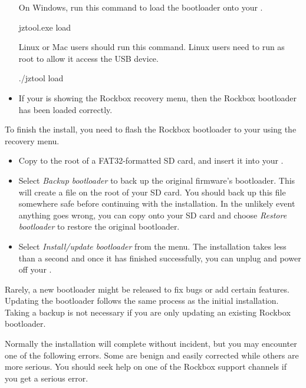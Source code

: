 \begin{itemize}
  On Windows, run this command to load the bootloader onto your \dap{}.
  \begin{code}
    jztool.exe \jztoolsubcommand{} load \bootfilename{}
  \end{code}
  Linux or Mac users should run this command. Linux users need to run
   as root to allow it access the USB device.
  \begin{code}
    ./jztool \jztoolsubcommand{} load \bootfilename{}
  \end{code}
\item If your \dap{} is showing the Rockbox recovery menu, then the Rockbox
  bootloader has been loaded correctly.
\end{itemize}

To finish the install, you need to flash the Rockbox bootloader to your \dap{}
using the recovery menu.

\begin{itemize}
\item Copy \bootfilename{} to the root of a FAT32-formatted SD card, and insert
  it into your \dap{}.
\item Select \emph{Backup bootloader} to back up the original firmware's
  bootloader. This will create a file \bootbackupfilename{} on the root of your
  SD card. You should back up this file somewhere safe before continuing with
  the installation. In the unlikely event anything goes wrong, you can copy
  \bootbackupfilename{} onto your SD card and choose \emph{Restore bootloader}
  to restore the original \playerman{} bootloader.
\item Select \emph{Install/update bootloader} from the menu. The installation
  takes less than a second and once it has finished successfully, you can
  unplug and power off your \dap{}.
\end{itemize}

Rarely, a new bootloader might be released to fix bugs or add certain features.
Updating the bootloader follows the same process as the initial installation.
Taking a backup is not necessary if you are only updating an existing Rockbox
bootloader.

Normally the installation will complete without incident, but you may encounter
one of the following errors. Some are benign and easily corrected while others
are more serious. You should seek help on one of the Rockbox support channels
if you get a serious error.

